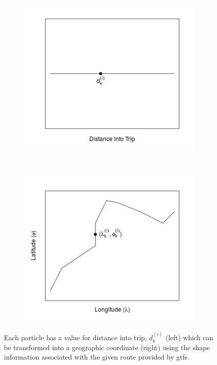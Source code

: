 \documentclass[12pt,a4paper]{article}
\begin{document}
\begin{figure}[!b]
  \centering
  \begin{subfigure}{0.4\textwidth}
    \includegraphics[width=\textwidth]{gps-dist2.png}
    \label{fig:gpsdist-1}
  \end{subfigure}
  ~
  \begin{subfigure}{0.4\textwidth}
    \includegraphics[width=\textwidth]{gps-dist1.png}
    \label{fig:gpsdist-2}
  \end{subfigure}
  \caption{%
  Each particle has a value for distance into trip, $d_k^{(i)}$ (left) which can be transformed
  into a geographic coordinate (right) using the shape information associated with
  the given route provided by \gls{gtfs}.}
  \label{fig:gpsdist}
\end{figure}
\end{document}
